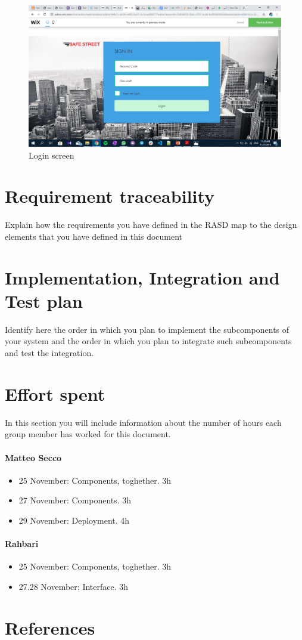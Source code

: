 \documentclass{article}
\begin{document}
		\begin{figure}[H]
			\includegraphics[width=\linewidth]{images/log in.png}
			\caption{Login screen}
		\end{figure}
	
\section{Requirement traceability}	Explain	how	the	requirements	you	have	defined	in	the	RASD	
map	to the	design	elements	that	you	have	defined	in	this	document
\section{Implementation, Integration and Test plan}	Identify	here	the	order	in	which	you	plan	
to	implement	the	subcomponents	of	your	system	and	the	order	in	which	you	plan	to	integrate	
such	subcomponents	and	test	the	integration.	
\section{Effort spent}In	 this	 section	you	will	include	information	about	 the	number	of	hours	each	
group	member	has	worked	for	this	document.
	\paragraph{Matteo Secco}
		\begin{itemize}
			\item 25 November: Components, toghether. 3h
			\item 27 November: Components. 3h
			\item 29 November: Deployment. 4h
		\end{itemize}
	\paragraph{Rahbari}
		\begin{itemize}
			\item 25 November: Components, toghether. 3h
			\item 27.28 November: Interface. 3h
		\end{itemize}
\section{References}
\end{document}
